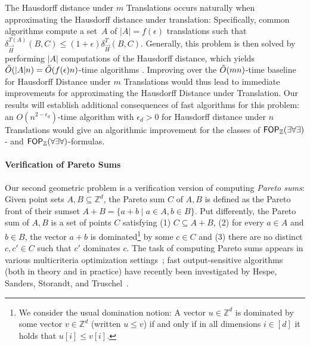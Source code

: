 The Hausdorff distance under $m$ Translations occurs naturally when approximating the Hausdorff distance under translation: Specifically, common algorithms compute a set~$A$ of $|A|= f(\epsilon)$ translations such that $\delta_{\overrightarrow{H}}^{T(A)}(B,C) \le (1+\epsilon)\delta_{\overrightarrow{H}}^{T}(B,C)$.
Generally, this problem is then solved by performing $|A|$ computations of the Hausdorff distance, which yields $\tilde{O}(|A|n)=\tilde{O}(f(\epsilon)n)$-time algorithms \cite{Wenk03}. Improving over the $\tilde{O}(m n)$-time baseline for Hausdorff Distance under $m$ Translations would thus lead to immediate improvements for approximating the Hausdorff Distance under Translation.
Our results will establish additional consequences of fast algorithms for this problem: an $O(n^{2-\epsilon_d})$-time algorithm with $\epsilon_d > 0$ for Hausdorff distance under $n$ Translations would give an algorithmic improvement for the classes of $\mathsf{FOP}_{\mathbb{Z}}(\exists \forall \exists)$- and $\mathsf{FOP}_{\mathbb{Z}}(\forall \exists \forall)$-formulas.





\paragraph*{Verification of Pareto Sums}

Our second geometric problem is a verification version of computing \emph{Pareto sums}: Given point sets $A,B \subseteq \mathbb{Z}^{d}$, the Pareto sum $C$ of $A,B$ is defined as the Pareto front of their sumset $A+B=\{a+b\mid a\in A,b\in B\}$. Put differently, the Pareto sum of $A,B$ is a set of points $C$ satisfying (1) $C \subseteq A+B$,  (2) for every $a \in A$ and $b \in B$, the vector $a+b$ is dominated\footnote{We consider the usual domination notion: A vector $u\in \mathbb{Z}^d$ is dominated by some vector $v\in \mathbb{Z}^d$ (written $u \leq v$) if and only if in all dimensions $i\in [d]$ it holds that $u[i]\leq v[i]$.} by some $c \in C$ and (3) there are no distinct $c,c' \in C$ such that $c'$ dominates $c$. 
The task of computing Pareto sums appears in various multicriteria optimization settings~\cite{artigues2013state,schulze2019multi,ehrgott2000survey,lust2014variable}; fast output-sensitive algorithms (both in theory and in practice) have recently been investigated by Hespe, Sanders, Storandt, and Truschel~\cite{DBLP:conf/esa/Hespe0ST23}. 

